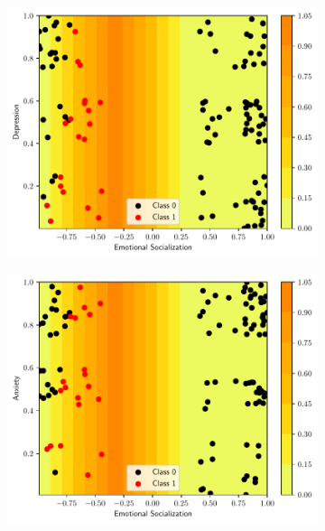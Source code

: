 \begin{figure}
  \begin{subfigure}[b]{0.32\textwidth}
    \centering \includegraphics[width=\textwidth]{figs/tree-contour-2-3.pdf}
    \caption{}
  \end{subfigure}
  \begin{subfigure}[b]{0.32\textwidth}
    \centering \includegraphics[width=\textwidth]{figs/tree-contour-2-4.pdf}
    \caption{}
  \end{subfigure}
  \begin{subfigure}[b]{0.32\textwidth}

\end{subfigure}
\end{figure}

